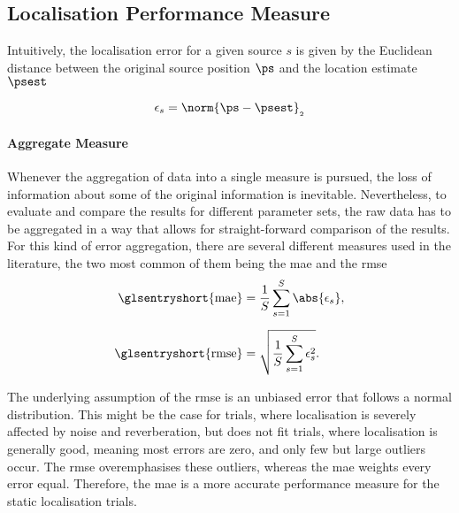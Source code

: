 \subsection{Localisation Performance Measure}
\label{sec:performanceMeasure}

Intuitively, the localisation error for a given source $s$ is given by the Euclidean distance between the original source position $\ps$ and the location estimate $\psest$

\begin{equation}
	\epsilon_s = \norm{\ps-\psest}_{_2}
	\label{eq:error}
\end{equation}

\paragraph{Aggregate Measure} Whenever the aggregation of data into a single measure is pursued, the loss of information about some of the original information is inevitable. Nevertheless, to evaluate and compare the results for different parameter sets, the raw data has to be aggregated in a way that allows for straight-forward comparison of the results. For this kind of error aggregation, there are several different measures used in the literature, the two most common of them being the \gls{mae} and the \gls{rmse}
\begin{align}
	\text{\glsentryshort{mae}}  & =\frac{1}{S}\sum_{s=1}^{S}\abs{\epsilon_s},    \\[6pt]
	\text{\glsentryshort{rmse}} & =\sqrt{\frac{1}{S}\sum_{s=1}^{S}\epsilon_s^2}.
	\label{eq:maeGeneral}
\end{align}

The underlying assumption of the \gls{rmse} is an unbiased error that follows a normal distribution. This might be the case for trials, where localisation is severely affected by noise and reverberation, but does not fit trials, where localisation is generally good, meaning most errors are zero, and only few but large outliers occur. The \gls{rmse} overemphasises these outliers, whereas the \gls{mae} weights every error equal. Therefore, the \gls{mae} is a more accurate performance measure for the static localisation trials.


